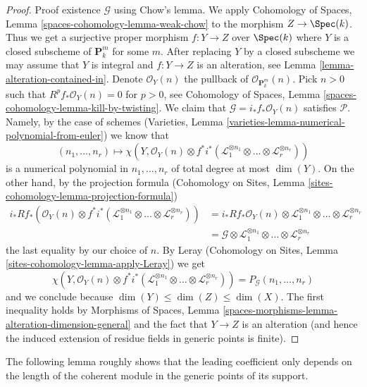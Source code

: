 \begin{proof}
\medskip\noindent
Proof existence $\mathcal{G}$ using Chow's lemma. We apply
Cohomology of Spaces, Lemma \ref{spaces-cohomology-lemma-weak-chow}
to the morphism $Z \to \Spec(k)$. Thus we get a
surjective proper morphism $f : Y \to Z$ over $\Spec(k)$
where $Y$ is a closed subscheme of $\mathbf{P}^m_k$ for some $m$.
After replacing $Y$ by a closed subscheme we may assume that $Y$
is integral and $f : Y \to Z$ is an alteration, see
Lemma \ref{lemma-alteration-contained-in}.
Denote $\mathcal{O}_Y(n)$ the pullback of $\mathcal{O}_{\mathbf{P}^m_k}(n)$.
Pick $n > 0$ such that $R^pf_*\mathcal{O}_Y(n) = 0$
for $p > 0$, see Cohomology of Spaces, Lemma
\ref{spaces-cohomology-lemma-kill-by-twisting}.
We claim that $\mathcal{G} = i_*f_*\mathcal{O}_Y(n)$ satisfies $\mathcal{P}$.
Namely, by the case of schemes
(Varieties, Lemma \ref{varieties-lemma-numerical-polynomial-from-euler})
we know that
$$
(n_1, \ldots, n_r)
\longmapsto
\chi(Y, \mathcal{O}_Y(n) \otimes
f^*i^*(\mathcal{L}_1^{\otimes n_1} \otimes \ldots \otimes
\mathcal{L}_r^{\otimes n_r}))
$$
is a numerical polynomial in $n_1, \ldots, n_r$ of total degree at
most $\dim(Y)$. On the other hand, by the projection formula
(Cohomology on Sites, Lemma \ref{sites-cohomology-lemma-projection-formula})
\begin{align*}
i_*Rf_*\left(
\mathcal{O}_Y(n) \otimes
f^*i^*(\mathcal{L}_1^{\otimes n_1} \otimes \ldots \otimes
\mathcal{L}_r^{\otimes n_r})\right)
& =
i_*Rf_*\mathcal{O}_Y(n) \otimes
\mathcal{L}_1^{\otimes n_1} \otimes \ldots \otimes
\mathcal{L}_r^{\otimes n_r} \\
& =
\mathcal{G} \otimes \mathcal{L}_1^{\otimes n_1} \otimes \ldots \otimes
\mathcal{L}_r^{\otimes n_r}
\end{align*}
the last equality by our choice of $n$. By
Leray (Cohomology on Sites, Lemma \ref{sites-cohomology-lemma-apply-Leray})
we get
$$
\chi(Y, \mathcal{O}_Y(n) \otimes
f^*i^*(\mathcal{L}_1^{\otimes n_1} \otimes \ldots \otimes
\mathcal{L}_r^{\otimes n_r})) =
P_\mathcal{G}(n_1, \ldots, n_r)
$$
and we conclude because $\dim(Y) \leq \dim(Z) \leq \dim(X)$.
The first inequality holds by
Morphisms of Spaces, Lemma
\ref{spaces-morphisms-lemma-alteration-dimension-general}
and the fact that $Y \to Z$ is an alteration (and hence the
induced extension of residue fields in generic points is finite).
\end{proof}

\noindent
The following lemma roughly shows that the leading coefficient only depends
on the length of the coherent module in the generic points of its
support.

